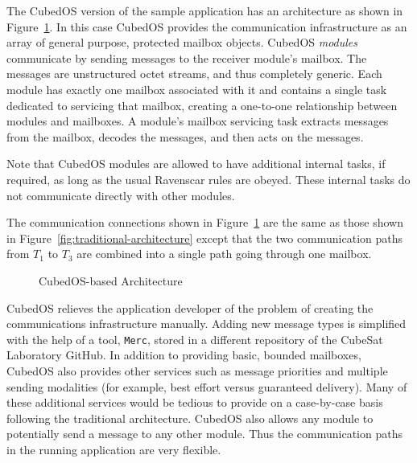 The CubedOS version of the sample application has an architecture as shown in
Figure~\ref{fig:cubedos-architecture}. In this case CubedOS provides the communication
infrastructure as an array of general purpose, protected mailbox objects. CubedOS
\textit{modules} communicate by sending messages to the receiver module's mailbox. The messages
are unstructured octet streams, and thus completely generic. Each module has exactly one mailbox
associated with it and contains a single task dedicated to servicing that mailbox, creating a
one-to-one relationship between modules and mailboxes. A module's mailbox servicing task
extracts messages from the mailbox, decodes the messages, and then acts on the messages.

Note that CubedOS modules are allowed to have additional internal tasks, if required, as long as
the usual Ravenscar rules are obeyed. These internal tasks do not communicate directly with
other modules.

The communication connections shown in Figure~\ref{fig:cubedos-architecture} are the same as
those shown in Figure~\ref{fig:traditional-architecture} except that the two communication paths
from $T_1$ to $T_3$ are combined into a single path going through one mailbox.

\begin{figure}[tbhp]
  \center
  \caption{CubedOS-based Architecture}
  \label{fig:cubedos-architecture}
\end{figure}

CubedOS relieves the application developer of the problem of creating the communications
infrastructure manually. Adding new message types is simplified with the help of a tool,
\texttt{Merc}, stored in a different repository of the CubeSat Laboratory GitHub. In addition to
providing basic, bounded mailboxes, CubedOS also provides other services such as message
priorities and multiple sending modalities (for example, best effort versus guaranteed
delivery). Many of these additional services would be tedious to provide on a case-by-case basis
following the traditional architecture. CubedOS also allows any module to potentially send a
message to any other module. Thus the communication paths in the running application are very
flexible.

